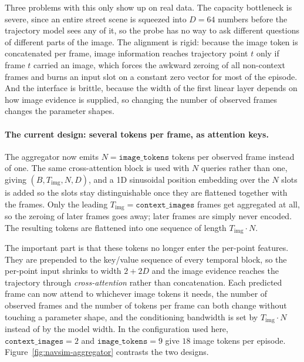 Three problems with this only show up on real data. The capacity bottleneck is
severe, since an entire street scene is squeezed into $D=64$ numbers before the
trajectory model sees any of it, so the probe has no way to ask different
questions of different parts of the image. The alignment is rigid: because the
image token is concatenated per frame, image information reaches trajectory point
$t$ only if frame $t$ carried an image, which forces the awkward zeroing of all
non-context frames and burns an input slot on a constant zero vector for most of
the episode. And the interface is brittle, because the width of the first linear
layer depends on how image evidence is supplied, so changing the number of
observed frames changes the parameter shapes.

\paragraph{The current design: several tokens per frame, as attention keys.}
The aggregator now emits $N=\texttt{image\_tokens}$ tokens per observed frame
instead of one. The same cross-attention block is used with $N$ queries rather
than one, giving $(B,T_{\text{img}},N,D)$, and a 1D sinusoidal position embedding
over the $N$ slots is added so the slots stay distinguishable once they are
flattened together with the frames. Only the leading
$T_{\text{img}}=\texttt{context\_images}$ frames get aggregated at all, so the
zeroing of later frames goes away; later frames are simply never encoded. The
resulting tokens are flattened into one sequence of length
$T_{\text{img}}\!\cdot\!N$.

The important part is that these tokens no longer enter the per-point features.
They are prepended to the key/value sequence of every temporal block, so the
per-point input shrinks to width $2+2D$ and the image evidence reaches the
trajectory through \emph{cross-attention} rather than concatenation. Each
predicted frame can now attend to whichever image tokens it needs, the number of
observed frames and the number of tokens per frame can both change without
touching a parameter shape, and the conditioning bandwidth is set by
$T_{\text{img}}\cdot N$ instead of by the model width. In the configuration used
here, $\texttt{context\_images}=2$ and $\texttt{image\_tokens}=9$ give $18$ image
tokens per episode. Figure~\ref{fig:navsim-aggregator} contrasts the two
designs.

